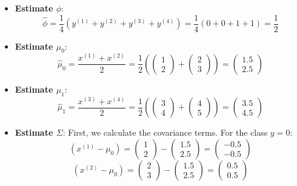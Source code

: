 \documentclass[12pt]{article}
\begin{document}
\begin{itemize}
    \item \textbf{Estimate $\phi$}:
    \[
    \hat{\phi} = \frac{1}{4} \left( y^{(1)} + y^{(2)} + y^{(3)} + y^{(4)} \right) = \frac{1}{4} \left( 0 + 0 + 1 + 1 \right) = \frac{1}{2}
    \]

    \item \textbf{Estimate $\mu_0$}:
    \[
    \hat{\mu}_0 = \frac{x^{(1)} + x^{(2)}}{2} = \frac{1}{2} \left( \begin{pmatrix} 1 \\ 2 \end{pmatrix} + \begin{pmatrix} 2 \\ 3 \end{pmatrix} \right) = \begin{pmatrix} 1.5 \\ 2.5 \end{pmatrix}
    \]

    \item \textbf{Estimate $\mu_1$}:
    \[
    \hat{\mu}_1 = \frac{x^{(3)} + x^{(4)}}{2} = \frac{1}{2} \left( \begin{pmatrix} 3 \\ 4 \end{pmatrix} + \begin{pmatrix} 4 \\ 5 \end{pmatrix} \right) = \begin{pmatrix} 3.5 \\ 4.5 \end{pmatrix}
    \]

    \item \textbf{Estimate $\Sigma$}: First, we calculate the covariance terms. For the class $y = 0$:
    \[
    (x^{(1)} - \mu_0) = \begin{pmatrix} 1 \\ 2 \end{pmatrix} - \begin{pmatrix} 1.5 \\ 2.5 \end{pmatrix} = \begin{pmatrix} -0.5 \\ -0.5 \end{pmatrix}
    \]
    \[
    (x^{(2)} - \mu_0) = \begin{pmatrix} 2 \\ 3 \end{pmatrix} - \begin{pmatrix} 1.5 \\ 2.5 \end{pmatrix} = \begin{pmatrix} 0.5 \\ 0.5 \end{pmatrix}
    \]


\end{itemize}
\end{document}
